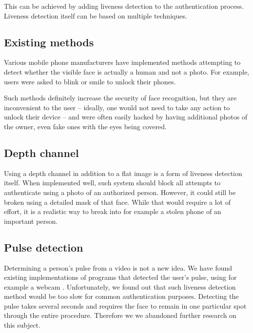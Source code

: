         This can be achieved by adding liveness detection to the authentication
        process. Liveness detection itself can be based on multiple techniques.

        \subsection*{Existing methods}
            Various mobile phone manufacturers have implemented methods attempting to
            detect whether the visible face is actually a human and not a photo.
            For example, users were asked to blink or smile to unlock their phones.

            Such methods definitely increase the security of face recognition,
            but they are inconvenient to the user -- ideally, one would not need to take
            any action to unlock their device -- and were often easily hacked by having
            additional photos of the owner, even fake ones with the eyes being covered.

        \subsection*{Depth channel}
            Using a depth channel in addition to a flat image is a form of liveness
            detection itself.
            When implemented well, such system should block all attempts to authenticate
            using a photo of an authorized person.
            However, it could still be broken using a detailed mask of that face.
            While that would require a lot of effort, it is a realistic way to break
            into for example a stolen phone of an important person.

        \subsection*{Pulse detection}
            Determining a person's pulse from a video is not a new idea.
            We have found existing implementations of programs that detected the user's
            pulse, using for example a webcam \cite{pulsedetector}.
            Unfortunately, we found out that such liveness detection method would be
            too slow for common authentication purposes.
            Detecting the pulse takes several seconds and requires the face to remain
            in one particular spot through the entire procedure.
            Therefore we we abandoned further research on this subject.


